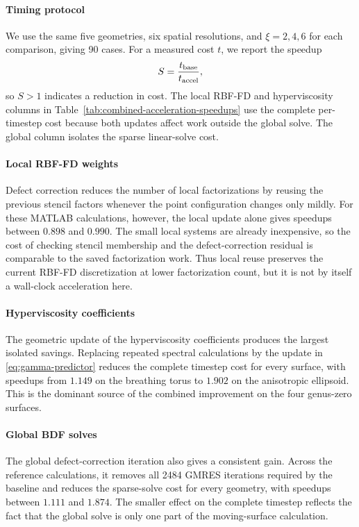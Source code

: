 \documentclass[a4paper,fleqn]{cas-sc}
\begin{document}
\paragraph{Timing protocol}
We use the same five geometries, six spatial resolutions, and
$\xi=2,4,6$ for each comparison, giving 90 cases.  For a measured cost $t$, we
report the speedup
\[
  S=\frac{t_{\rm base}}{t_{\rm accel}},
\]
so $S>1$ indicates a reduction in cost.  The local RBF-FD and hyperviscosity
columns in Table~\ref{tab:combined-acceleration-speedups} use the complete
per-timestep cost because both updates affect work outside the global solve.
The global column isolates the sparse linear-solve cost.

\paragraph{Local RBF-FD weights}
Defect correction reduces the number of local factorizations by reusing the
previous stencil factors whenever the point configuration changes only mildly.
For these MATLAB calculations, however, the local update alone gives speedups
between $0.898$ and $0.990$.  The small local systems are already inexpensive,
so the cost of checking stencil membership and the defect-correction residual
is comparable to the saved factorization work.  Thus local reuse preserves the
current RBF-FD discretization at lower factorization count, but it is not by
itself a wall-clock acceleration here.

\paragraph{Hyperviscosity coefficients}
The geometric update of the hyperviscosity coefficients produces the largest
isolated savings.  Replacing repeated spectral calculations by the update in
\eqref{eq:gamma-predictor} reduces the complete timestep cost for every surface,
with speedups from $1.149$ on the breathing torus to $1.902$ on the anisotropic
ellipsoid.  This is the dominant source of the combined improvement on the four
genus-zero surfaces.

\paragraph{Global BDF solves}
The global defect-correction iteration also gives a consistent gain.  Across
the reference calculations, it removes all 2484 GMRES iterations required by
the baseline and reduces the sparse-solve cost for every geometry, with
speedups between $1.111$ and $1.874$.  The smaller effect on the complete
timestep reflects the fact that the global solve is only one part of the
moving-surface calculation.
\end{document}
